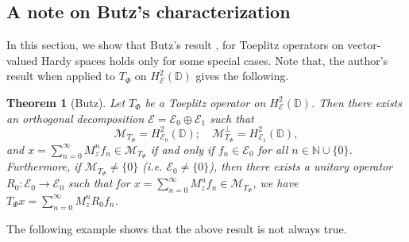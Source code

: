 \documentclass[12pt]{amsart}
\numberwithin{equation}{section}
\newtheorem{thm}[propn]{Theorem}
\theoremstyle{definition}
\newcommand{\Nat}{\mathbb{N}}
\newcommand{\D}{\mathbb{D}}
\newcommand{\T}{\mathbb{T}}
\newcommand{\1}{{\mbox{\bf 1}}}
\newcommand{\clb}{\mathcal{B}}
\newcommand{\cle}{\mathcal{E}}
\newcommand{\clm}{\mathcal{M}}
\newcommand{\raro}{\rightarrow}
\begin{document}

\subsection{A note on  Butz's characterization}\label{Butz}
In this section, we show that Butz's result \cite{Butz}, for Toeplitz operators on vector-valued Hardy spaces holds only for some special cases. Note that, the author's result when applied to $T_{\Phi}$ on $H_{\cle}^2(\D)$ gives the following.
\begin{thm}[Butz] 
Let $T_{\Phi}$ be a Toeplitz operator on $H_{\cle}^2(\D)$. Then there exists an orthogonal  decomposition $\cle = \cle_0 \oplus \cle_1$ such that 
\[
\clm_{T_{\Phi}} = H_{\cle_0}^2(\D); \quad \clm_{T_{\Phi}}^{\perp} = H_{\cle_1}^2(\D), 
\]
and $x = \sum_{n=0}^{\infty} M_z^n f_n \in \clm_{T_{\Phi}}$ if and only if $f_n \in \cle_0$ for all $n \in \Nat \cup \{0\}$. Furthermore, if $\clm_{T_{\Phi}} \neq \{0\}$ (i.e. $ \cle_0 \neq \{0\}$), then there exists a unitary operator $R_0: \cle_0 \raro \cle_0$ such that for $x = \sum_{n=0}^{\infty} M_z^n f_n \in \clm_{T_{\Phi}}$, we have $T_{\Phi}x = \sum_{n=0}^{\infty} M_z^n R_0 f_n$.
\end{thm}
The following example shows that the above result is not always true.
\end{document}
